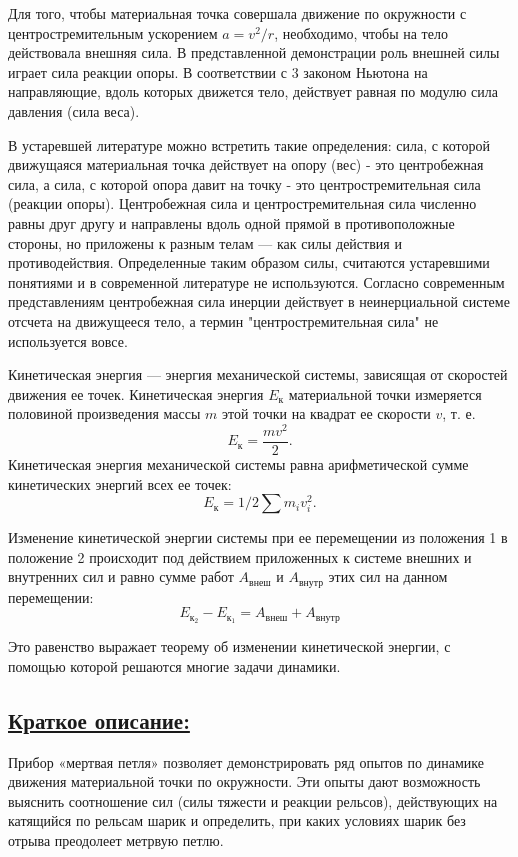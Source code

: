 \documentclass[14pt,a4paper,oneside]{extarticle}	%
\begin{document}
Для того, чтобы материальная точка совершала движение по окружности с центростремительным ускорением $a = v^2/r$, необходимо, чтобы на тело действовала внешняя сила. В представленной демонстрации роль внешней силы играет сила реакции опоры. В соответствии с 3 законом Ньютона на направляющие, вдоль которых движется тело, действует равная по модулю сила давления (сила веса).

В устаревшей литературе можно встретить такие определения: сила, с которой движущаяся материальная точка действует на опору (вес) - это центробежная сила, а сила, с которой опора давит на точку - это центростремительная сила (реакции опоры).
Центробежная сила и центростремительная сила численно равны друг другу и направлены вдоль одной прямой в противоположные стороны, но приложены к разным телам — как силы действия и противодействия.
Определенные таким образом силы, считаются устаревшими понятиями и в современной литературе не используются.
Согласно современным представлениям центробежная сила инерции действует в неинерциальной системе отсчета на движущееся тело, а термин "центростремительная сила" не используется вовсе.

Кинетическая энергия — энергия механической системы, зависящая от скоростей движения ее точек.
Кинетическая энергия $ E_{\text{к}} $ материальной точки измеряется половиной произведения массы $ m $ этой точки на квадрат ее скорости $ v $, т. е. $$ E_{\text{к}}  = \frac{mv^2}{2}. $$ 
Кинетическая энергия механической системы равна арифметической сумме кинетических энергий всех ее точек: 
$$ E_{\text{к}}  = 1/2 \sum  m_i v_i^2.$$ 

Изменение кинетической энергии системы при ее перемещении из положения 1 в положение 2 
происходит под действием приложенных к системе внешних и внутренних сил и равно сумме работ $ A_{\text{внеш}}$ и $ A_{\text{внутр}}$ этих сил на данном перемещении:
$$
E_{\text{к}_{2}} - E_{\text{к}_{1}} = A_{\text{внеш}} + A_{\text{внутр}}
$$
 
Это равенство выражает теорему об изменении кинетической энергии, с помощью которой решаются многие задачи динамики.

\newpage
\subsection*{\underline{Краткое описание:}}

Прибор «мертвая петля» позволяет демонстрировать ряд опытов по динамике движения материальной точки по окружности.
Эти опыты дают возможность выяснить соотношение сил (силы тяжести и реакции рельсов), действующих на катящийся по рельсам шарик и определить, при каких условиях шарик без отрыва преодолеет метрвую петлю.
\end{document}
